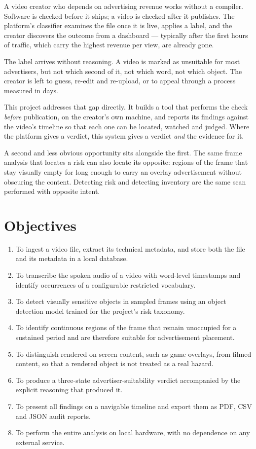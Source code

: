 \documentclass[
12pt,
a4paper,
oneside
]{report}
\begin{document}
A video creator who depends on advertising revenue works without a compiler.
Software is checked before it ships; a video is checked after it publishes. The
platform's classifier examines the file once it is live, applies a label, and
the creator discovers the outcome from a dashboard --- typically after the first
hours of traffic, which carry the highest revenue per view, are already gone.

The label arrives without reasoning. A video is marked as unsuitable for most
advertisers, but not which second of it, not which word, not which object. The
creator is left to guess, re-edit and re-upload, or to appeal through a process
measured in days.

This project addresses that gap directly. It builds a tool that performs the
check \emph{before} publication, on the creator's own machine, and reports its
findings against the video's timeline so that each one can be located, watched
and judged. Where the platform gives a verdict, this system gives a verdict
\emph{and} the evidence for it.

A second and less obvious opportunity sits alongside the first. The same frame
analysis that locates a risk can also locate its opposite: regions of the frame
that stay visually empty for long enough to carry an overlay advertisement
without obscuring the content. Detecting risk and detecting inventory are the
same scan performed with opposite intent.

\section{Objectives}

\begin{enumerate}[itemsep=3pt]
\item To ingest a video file, extract its technical metadata, and store both the
file and its metadata in a local database.
\item To transcribe the spoken audio of a video with word-level timestamps and
identify occurrences of a configurable restricted vocabulary.
\item To detect visually sensitive objects in sampled frames using an object
detection model trained for the project's risk taxonomy.
\item To identify continuous regions of the frame that remain unoccupied for a
sustained period and are therefore suitable for advertisement placement.
\item To distinguish rendered on-screen content, such as game overlays, from
filmed content, so that a rendered object is not treated as a real hazard.
\item To produce a three-state advertiser-suitability verdict accompanied by the
explicit reasoning that produced it.
\item To present all findings on a navigable timeline and export them as PDF,
CSV and JSON audit reports.
\item To perform the entire analysis on local hardware, with no dependence on
any external service.
\end{enumerate}
\end{document}
